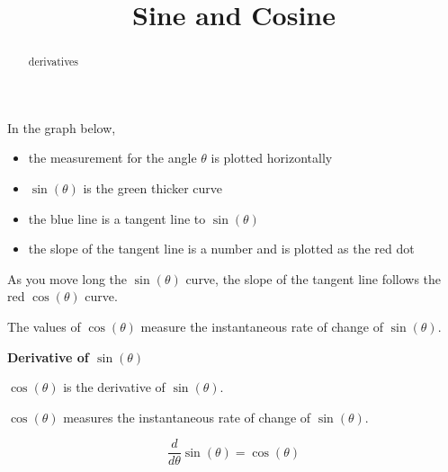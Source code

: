 \documentclass{ximera}
\title{Sine and Cosine}
\begin{document}
\begin{abstract}
derivatives
\end{abstract}
\maketitle








In the graph below, 

\begin{itemize}
\item the measurement for the angle $\theta$ is plotted horizontally
\item $\sin(\theta)$ is the green thicker curve
\item the blue line is a tangent line to $\sin(\theta)$
\item the slope of the tangent line is a number and is plotted as the red dot
\end{itemize}

As you move long the $\sin(\theta)$ curve, the slope of the tangent line follows the red $\cos(\theta)$ curve.







\begin{center}
\end{center}


\begin{center}
\end{center}



The values of $\cos(\theta)$ measure the instantaneous rate of change of $\sin(\theta)$.



\begin{theorem}  \textbf{\textcolor{green!50!black}{Derivative of $\sin(\theta)$}}

\begin{center}
$\cos(\theta)$ is the derivative of $\sin(\theta)$.  

$\cos(\theta)$ measures the instantaneous rate of change of $\sin(\theta)$.  
\end{center}


\[
\frac{d}{d\theta} \sin(\theta) = \cos(\theta)
\]

\end{theorem}
\end{document}
